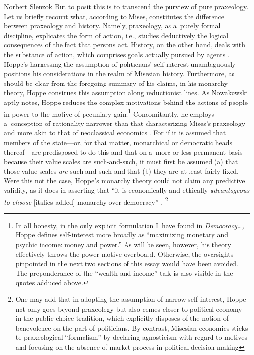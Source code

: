 \begin{artengenv}{Norbert Slenzok}
But to posit this is to transcend the purview of pure praxeology. Let us briefly recount what, according to Mises, constitutes the difference between praxeology and history. Namely, praxeology, as a~purely formal discipline, explicates the form of action, i.e., studies deductively the logical consequences of the fact that persons act. History, on the other hand, deals with the substance of action, which comprises goals actually pursued by agents 
\parencite[][p.271]{mises_theory_2007}. %
 Hoppe's harnessing the assumption of politicians' self-interest unambiguously positions his considerations in the realm of Misesian history. Furthermore, as should be clear from the foregoing summary of his claims, in his monarchy theory, Hoppe construes this assumption along reductionist lines. As Nowakowski 
\parencite*[][p.272]{nowakowski_dlaczego_2010} %
 aptly notes, Hoppe reduces the complex motivations behind the actions of people in power to the motive of pecuniary gain.\footnote{In all honesty, in the only explicit formulation I~have found in \textit{Democracy…,} Hoppe 
\parencite*[][p.144]{hoppe_democracy_2007} %
 defines self-interest more broadly as ``maximizing monetary and psychic income: money and power.'' As will be seen, however, his theory effectively throws the power motive overboard. Otherwise, the oversights pinpointed in the next two sections of this essay would have been avoided. The preponderance of the ``wealth and income'' talk is also visible in the quotes adduced above. } Concomitantly, he employs a~conception of rationality narrower than that characterizing Mises's praxeology and more akin to that of neoclassical economics 
\parencites[see][]{long_realism_2006}[][]{coyne_problem_2015}. %
 For if it is assumed that members of the state---or, for that matter, monarchical or democratic heads thereof---are predisposed to do this-and-that on a~more or less permanent basis because their value scales are such-and-such, it must first be assumed (a) that those value scales \textit{are} such-and-such and that (b) they are at least fairly fixed. Were this not the case, Hoppe's monarchy theory could not claim any predictive validity, as it does in asserting that ``it is economically and ethically \textit{advantageous to choose} [italics added] monarchy over democracy'' 
\parencite[][p.xx]{hoppe_democracy_2007}.%
\footnote{One may add that in adopting the assumption of narrow self-interest, Hoppe not only goes beyond praxeology but also comes closer to political economy in the public choice tradition, which explicitly disposes of the notion of benevolence on the part of politicians. By contrast, Misesian economics sticks to praxeological ``formalism'' by declaring agnosticism with regard to motives and focusing on the absence of market process in political decision-making 
}
\end{artengenv}
